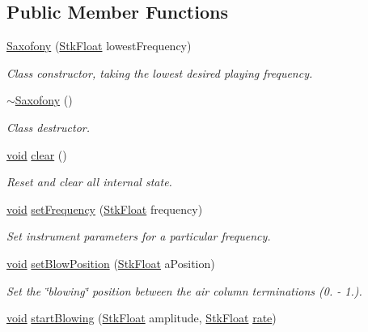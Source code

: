 \subsection*{Public Member Functions}
\begin{DoxyCompactItemize}
\item 
\hyperlink{class_nyq_1_1_saxofony_a6a179b32c0000dbadd90fe7e59365f37}{Saxofony} (\hyperlink{namespace_nyq_a044fa20a706520a617bbbf458a7db7e4}{Stk\+Float} lowest\+Frequency)
\begin{DoxyCompactList}\small\item\em Class constructor, taking the lowest desired playing frequency. \end{DoxyCompactList}\item 
\hyperlink{class_nyq_1_1_saxofony_af7d7d1a397cb441cacb851f9f6160536}{$\sim$\+Saxofony} ()
\begin{DoxyCompactList}\small\item\em Class destructor. \end{DoxyCompactList}\item 
\hyperlink{sound_8c_ae35f5844602719cf66324f4de2a658b3}{void} \hyperlink{class_nyq_1_1_saxofony_aeb91ca1bfccf413ce6eb788231ad026e}{clear} ()
\begin{DoxyCompactList}\small\item\em Reset and clear all internal state. \end{DoxyCompactList}\item 
\hyperlink{sound_8c_ae35f5844602719cf66324f4de2a658b3}{void} \hyperlink{class_nyq_1_1_saxofony_ae6827fd08c4727b9c1ea45c63be756e9}{set\+Frequency} (\hyperlink{namespace_nyq_a044fa20a706520a617bbbf458a7db7e4}{Stk\+Float} frequency)
\begin{DoxyCompactList}\small\item\em Set instrument parameters for a particular frequency. \end{DoxyCompactList}\item 
\hyperlink{sound_8c_ae35f5844602719cf66324f4de2a658b3}{void} \hyperlink{class_nyq_1_1_saxofony_ada292f0aa657fd8b86e5d25852e06fc0}{set\+Blow\+Position} (\hyperlink{namespace_nyq_a044fa20a706520a617bbbf458a7db7e4}{Stk\+Float} a\+Position)
\begin{DoxyCompactList}\small\item\em Set the \char`\"{}blowing\char`\"{} position between the air column terminations (0. -\/ 1.). \end{DoxyCompactList}\item 
\hyperlink{sound_8c_ae35f5844602719cf66324f4de2a658b3}{void} \hyperlink{class_nyq_1_1_saxofony_ab510f81532583ebecf12db65839d0aef}{start\+Blowing} (\hyperlink{namespace_nyq_a044fa20a706520a617bbbf458a7db7e4}{Stk\+Float} amplitude, \hyperlink{namespace_nyq_a044fa20a706520a617bbbf458a7db7e4}{Stk\+Float} \hyperlink{seqread_8c_ad89d3fac2deab7a9cf6cfc8d15341b85}{rate})

\end{DoxyCompactItemize}
